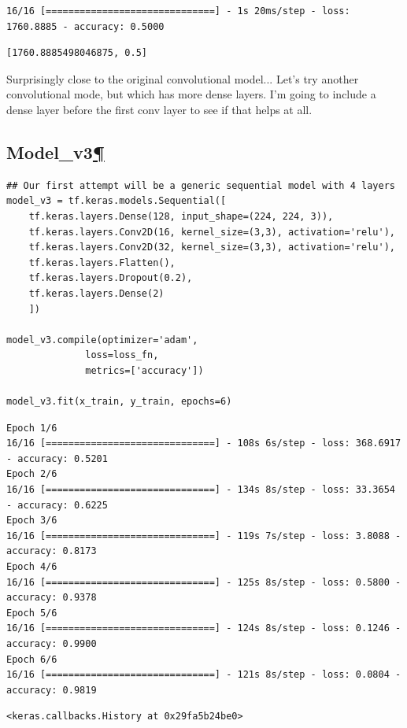 \documentclass[
]{article}
\begin{document}
\begin{verbatim}
16/16 [==============================] - 1s 20ms/step - loss: 1760.8885 - accuracy: 0.5000
\end{verbatim}

\begin{verbatim}
[1760.8885498046875, 0.5]
\end{verbatim}

Surprisingly close to the original convolutional model... Let's try
another convolutional mode, but which has more dense layers. I'm going
to include a dense layer before the first conv layer to see if that
helps at all.

\hypertarget{Model_v3}{%
\subsection{\texorpdfstring{Model\_v3\protect\hyperlink{Model_v3}{¶}}{Model\_v3¶}}\label{Model_v3}}

\begin{Verbatim}[frame=single]
## Our first attempt will be a generic sequential model with 4 layers
model_v3 = tf.keras.models.Sequential([
    tf.keras.layers.Dense(128, input_shape=(224, 224, 3)),
    tf.keras.layers.Conv2D(16, kernel_size=(3,3), activation='relu'),
    tf.keras.layers.Conv2D(32, kernel_size=(3,3), activation='relu'),
    tf.keras.layers.Flatten(),
    tf.keras.layers.Dropout(0.2),
    tf.keras.layers.Dense(2)
    ])

model_v3.compile(optimizer='adam',
              loss=loss_fn,
              metrics=['accuracy'])

model_v3.fit(x_train, y_train, epochs=6)
\end{Verbatim}

\begin{verbatim}
Epoch 1/6
16/16 [==============================] - 108s 6s/step - loss: 368.6917 - accuracy: 0.5201
Epoch 2/6
16/16 [==============================] - 134s 8s/step - loss: 33.3654 - accuracy: 0.6225
Epoch 3/6
16/16 [==============================] - 119s 7s/step - loss: 3.8088 - accuracy: 0.8173
Epoch 4/6
16/16 [==============================] - 125s 8s/step - loss: 0.5800 - accuracy: 0.9378
Epoch 5/6
16/16 [==============================] - 124s 8s/step - loss: 0.1246 - accuracy: 0.9900
Epoch 6/6
16/16 [==============================] - 121s 8s/step - loss: 0.0804 - accuracy: 0.9819
\end{verbatim}

\begin{verbatim}
<keras.callbacks.History at 0x29fa5b24be0>
\end{verbatim}
\end{document}
